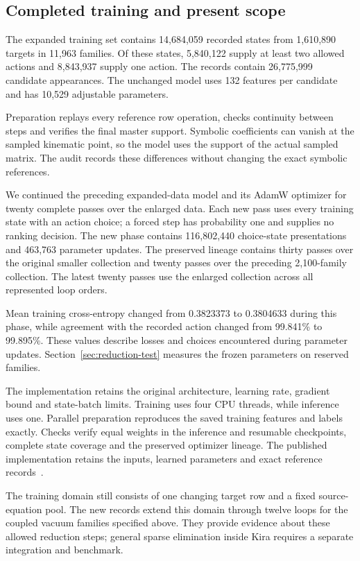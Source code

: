 \subsection{Completed training and present scope}
The expanded training set contains 14,684,059 recorded states from
1,610,890 targets in 11,963 families. Of these states,
5,840,122 supply at least two allowed actions and
8,843,937 supply one action. The records contain
26,775,999 candidate appearances. The unchanged model
uses 132 features per candidate and has 10,529 adjustable parameters.

Preparation replays every reference row operation, checks continuity
between steps and verifies the final master support. Symbolic
coefficients can vanish at the sampled kinematic point, so the model
uses the support of the actual sampled matrix. The audit records
these differences without changing the exact symbolic references.

We continued the preceding expanded-data model and its AdamW
optimizer for twenty complete passes over the enlarged data. Each new pass
uses every training state with an action choice; a forced step has
probability one and supplies no ranking decision. The new phase
contains 116,802,440 choice-state presentations and
463,763 parameter updates. The preserved lineage contains thirty
passes over the original smaller collection and twenty passes over
the preceding 2,100-family collection. The latest twenty passes
use the enlarged collection across all represented loop orders.

Mean training cross-entropy changed from 0.3823373 to
0.3804633 during this phase, while agreement with the recorded
action changed from 99.841\% to 99.895\%.
These values describe losses and choices encountered during
parameter updates. Section~\ref{sec:reduction-test} measures the
frozen parameters on reserved families.

The implementation retains the original architecture, learning rate,
gradient bound and state-batch limits. Training uses four CPU threads,
while inference uses one. Parallel preparation reproduces the saved
training features and labels exactly. Checks verify equal weights
in the inference and resumable checkpoints, complete state coverage
and the preserved optimizer lineage. The published implementation
retains the inputs, learned parameters and exact reference
records~\cite{ReductionModelData}.

The training domain still consists of one changing target row and a
fixed source-equation pool. The new records extend this domain
through twelve loops for the coupled vacuum families specified
above. They provide evidence about these allowed reduction steps;
general sparse elimination inside Kira requires a separate
integration and benchmark.
